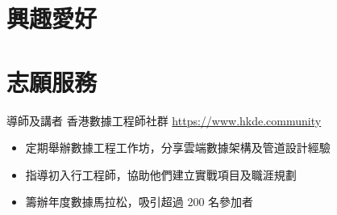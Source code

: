 \documentclass[a4paper, serif, 10pt]{moderncv}
\begin{document}
\section{興趣愛好}

\section{志願服務}

        {導師及講者}
        {香港數據工程師社群}
        {\url{https://www.hkde.community}}
        {}
        {\begin{itemize}
\item 定期舉辦數據工程工作坊，分享雲端數據架構及管道設計經驗
\item 指導初入行工程師，協助他們建立實戰項目及職涯規劃
\item 籌辦年度數據馬拉松，吸引超過 200 名參加者
\end{itemize}}
    
\end{document}
